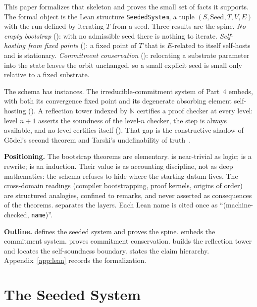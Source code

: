 \documentclass[11pt,a4paper]{article}
\newcommand{\Nat}{\mathbb{N}}
\newcommand{\Seed}{\mathrm{Seed}}
\begin{document}
This paper formalizes that skeleton and proves the small set of facts it
supports.
The formal object is the Lean structure \texttt{SeededSystem}, a tuple
$(S, \Seed, T, V, E)$ with the run defined by iterating $T$ from a seed.
Three results are the spine.
\emph{No empty bootstrap} (): with no admissible seed there
is nothing to iterate.
\emph{Self-hosting from fixed points} (): a fixed point
of $T$ that is $E$-related to itself self-hosts and is stationary.
\emph{Commitment conservation} (): relocating a substrate
parameter into the state leaves the orbit unchanged, so a small explicit seed is
small only relative to a fixed substrate.

The schema has instances.
The irreducible-commitment system of Part~4 embeds, with both its convergence
fixed point and its degenerate absorbing element self-hosting
().
A reflection tower indexed by $\Nat$ certifies a proof checker at every level:
level $n+1$ asserts the soundness of the level-$n$ checker, the step is always
available, and no level certifies itself
().
That gap is the constructive shadow of G\"odel's second theorem and Tarski's
undefinability of truth~\cite{godel1931}.

\textbf{Positioning.}
The bootstrap theorems are elementary.
 is near-trivial as logic;
 is a rewrite;
 is an induction.
Their value is as accounting discipline, not as deep mathematics: the schema
refuses to hide where the starting datum lives.
The cross-domain readings (compiler bootstrapping, proof kernels, origins of
order) are structured analogies, confined to remarks, and never asserted as
consequences of the theorems.
 separates the layers.
Each Lean name is cited once as ``(machine-checked, \texttt{name})''.

\textbf{Outline.}
 defines the seeded system and proves the spine.
 embeds the commitment system.
 proves commitment conservation.
 builds the reflection tower and locates the
self-soundness boundary.
 states the claim hierarchy.
Appendix~\ref{app:lean} records the formalization.

\section{The Seeded System}
\label{sec:schema}
\end{document}
